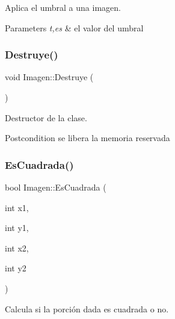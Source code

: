 Aplica el umbral a una imagen. 


\begin{DoxyParams}{Parameters}
{\em t,es} & el valor del umbral \\
\hline
\end{DoxyParams}
\mbox{\label{class_imagen_ab0161e7224c194d421c475eeae178708}} 
\subsubsection{\texorpdfstring{Destruye()}{Destruye()}}
{\footnotesize\ttfamily void Imagen\+::\+Destruye (\begin{DoxyParamCaption}{ }\end{DoxyParamCaption})}



Destructor de la clase. 

\begin{DoxyPostcond}{Postcondition}
se libera la memoria reservada 
\end{DoxyPostcond}
\mbox{\label{class_imagen_aae6fb4b642b1d59482de7920c381bda4}} 
\subsubsection{\texorpdfstring{Es\+Cuadrada()}{EsCuadrada()}}
{\footnotesize\ttfamily bool Imagen\+::\+Es\+Cuadrada (\begin{DoxyParamCaption}\item[{int}]{x1,  }\item[{int}]{y1,  }\item[{int}]{x2,  }\item[{int}]{y2 }\end{DoxyParamCaption})}



Calcula si la porción dada es cuadrada o no. 


